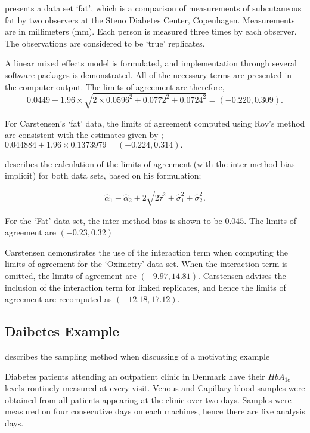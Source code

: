 \documentclass[12pt, a4paper]{report}
\theoremstyle{plain}
\theoremstyle{definition}
\theoremstyle{remark}
\begin{document}
			\citet{BXC2008} presents a data set `fat', which is a comparison of measurements of subcutaneous fat
			by two observers at the Steno Diabetes Center, Copenhagen. Measurements are in millimeters
			(mm). Each person is measured three times by each observer. The observations are considered to be `true' replicates.
			
			A linear mixed effects model is formulated, and implementation through several software packages is demonstrated.
			All of the necessary terms are presented in the computer output. The limits of agreement are therefore,
			\begin{equation}
			0.0449  \pm 1.96 \times  \sqrt{2 \times 0.0596^2 + 0.0772^2 + 0.0724^2} = (-0.220,  0.309).
			\end{equation}
			
	For Carstensen's `fat' data, the limits of agreement computed using Roy's
	method are consistent with the estimates given by \citet{BXC2008}; $0.044884  \pm 1.96 \times  0.1373979 = (-0.224,  0.314).$	
	
	
	\citet{bxc2008} describes the calculation of the limits of agreement (with the inter-method bias implicit) for both data sets, based on his formulation;
	
	\[\hat{\alpha}_1 - \hat{\alpha}_2 \pm 2\sqrt{2\hat{\tau}^2 +\hat{\sigma}_1^2 +\hat{\sigma}_2^2 }.\]
	
	For the `Fat' data set, the inter-method bias is shown to be $0.045$. The limits of agreement are $(-0.23 , 0.32)$
	
	
	
	Carstensen demonstrates the use of the interaction term when computing the limits of agreement for the `Oximetry' data set. When the interaction term is omitted, the limits of agreement are $(-9.97, 14.81)$. Carstensen advises the inclusion of the interaction term for linked replicates, and hence the limits of agreement are recomputed as $(-12.18,17.12)$.
	
	\subsection{Daibetes Example}
	\citet{BXC2008} describes the sampling method when discussing of a motivating example
	
	Diabetes patients attending an outpatient clinic in Denmark have their $HbA_{1c}$ levels routinely measured at every visit. Venous and Capillary blood samples were obtained from all patients appearing at the clinic over two days. Samples were measured on four consecutive days on each machines, hence there are five analysis days.
	
\end{document}
